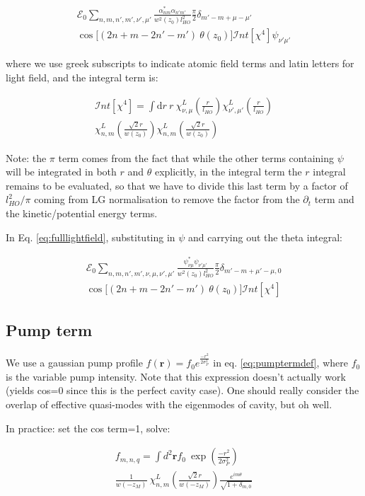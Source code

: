 \documentclass[a4paper,twocolumn,nobalancelastpage]{revtex4-1}
\newcommand{\vect}[1]{\mathbf{#1}}
\newcommand{\lho}{l_{HO}}
\newcommand{\wzsq}{w^2(z_0)}
\newcommand{\af}{\psi_{\nu\mu}}
\newcommand{\afp}{\psi_{\nu'\mu'}}
\newcommand{\lf}{\alpha_{nm}}
\newcommand{\lfp}{\alpha_{n'm'}}
\newcommand{\chiaf}{\chi_{\nu,\mu}^L\left(\frac{r}{\lho}\right)}
\newcommand{\chiafp}{\chi_{\nu',\mu'}^L\left(\frac{r}{\lho}\right)}
\newcommand{\chilf}{\chi_{n,m}^L\left(\frac{\sqrt{2}r}{w(z_0)}\right)}
\newcommand{\chilfp}{\chi_{n,m}^L\left(\frac{\sqrt{2}r}{w(z_0)}\right)}
\newcommand{\intfour}{\mathcal{I}nt[\chi^4]}
\begin{document}
\begin{multline}
\label{eq:lasttermpsi}
\mathcal{E}_0 \sum_{n,m,n',m',\nu',\mu'} \frac{\lf^* \lfp}{\wzsq \lho^2} \frac{\pi}{2} \delta_{m'-m+\mu-\mu'}
\\ \cos \big[(2n+m-  2n'-m') 
\ \theta(z_0)\big]  \intfour \psi_{\nu' \mu'}
\end{multline}

where we use greek subscripts to indicate atomic field terms and latin letters for light field, and the integral term is:

\begin{multline}
\label{eq:intfour}
\mathcal{I}nt[\chi^4]=\int \mathrm{d}r \ r \  \chiaf \chiafp \\ \chilf \chilfp
\end{multline}

Note: the $\pi$ term comes from the fact that while the other terms containing $\psi$ will be integrated in both $r$ and $\theta$ explicitly, in the integral term the $r$ integral remains to be evaluated, so that we have to divide this last term by a factor of $l_{HO}^2/\pi$ coming from LG normalisation to remove the factor from the $\partial_t$ term and the kinetic/potential energy terms.

In Eq. \ref{eq:fulllightfield}, substituting in $\psi$ and carrying out the theta integral:

\begin{multline}
\label{eq:lasttermalpha}
\mathcal{E}_0 \sum_{n,m,n',m', \nu, \mu, \nu',\mu'} \frac{ \af^* \afp}{\wzsq \lho^2}
\frac{\pi}{2} \delta_{m'-m+\mu'-\mu,0}\\
\cos \big[(2n+m-  2n'-m') 
\ \theta(z_0)\big] \intfour
\end{multline}

\subsection{Pump term}

We use a gaussian pump profile $f(\vect{r})= f_0 e^{\frac{-r^2}{2\sigma_P^2}}$ in eq. \eqref{eq:pumptermdef}, where $f_0$ is the variable pump intensity. Note that this expression doesn't actually work (yields cos=0 since this is the perfect cavity case). One should really consider the overlap of effective quasi-modes with the eigenmodes of cavity, but oh well.

In practice: set the cos term=1, solve:

\begin{multline}
f_{m,n,q} = \int d^2\vect{r} f_0 \ \exp \left(\frac{-r^2}{2\sigma_P^2} \right) \\ \frac{1}{w(-z_{M})} \ \chi_{n,m}^L  \left(\frac{\sqrt{2}r}{w(-z_{M})}\right) \frac{e^{im\theta}}{\sqrt{1+\delta_{m,0}}}
\end{multline}
\end{document}
